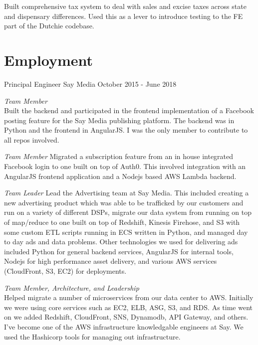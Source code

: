 \documentclass[margin]{res}
\begin{document}
\begin{resume}
                Built comprehensive tax system to deal with sales and excise taxes across
                state and dispensary differences.  Used this as a lever to introduce testing
                to the FE part of the Dutchie codebase.

    \section{Employment} {Principal Engineer Say Media \hfill October 2015 - June 2018}

                \emph{Team Member}\\
                Built the backend and participated in the frontend implementation of
                a Facebook posting feature for the Say Media publishing platform.  The backend was
                in Python and the frontend in AngularJS.  I was the only member to contribute
                to all repos involved.

                \emph{Team Member} Migrated a subscription feature from an in house integrated Facebook login
                to one built on top of Auth0.  This involved integration with an AngularJS frontend
                application and a Nodejs based AWS Lambda backend.

                \emph{Team Leader} Lead the Advertising team at Say Media.  This included creating a new
                advertising product which was able to be trafficked by our customers and run
                on a variety of different DSPs, migrate our data system from running on
                top of map/reduce to one built on top of Redshift, Kinesis Firehose, and
                S3 with some custom ETL scripts running in ECS written in Python, and managed
                day to day ads and data problems.  Other technologies we used for delivering
                ads included Python for general backend services, AngularJS for internal
                tools, Nodejs for high performance asset delivery,
                and various AWS services (CloudFront, S3, EC2) for deployments.

                \emph{Team Member, Architecture, and Leadership}\\
                Helped migrate a number of microservices from our data center to
                AWS.  Initially we were using core services such as EC2, ELB, ASG, S3,
                and RDS.  As time went on we added Redshift, CloudFront, SNS, Dynamodb,
                API Gateway, and others.  I've become one of the AWS infrastructure
                knowledgable engineers at Say.  We used the Hashicorp tools for managing
                out infrastructure.


\end{resume}
\end{document}
